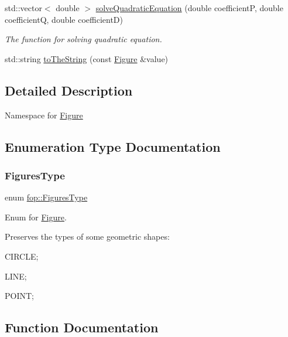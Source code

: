 \begin{DoxyCompactItemize}
std\+::vector$<$ double $>$ \mbox{\hyperlink{namespacefop_a28077bc23913a5e5f1522e7fbb13bcfe}{solve\+Quadratic\+Equation}} (double coefficientP, double coefficientQ, double coefficientD)
\begin{DoxyCompactList}\small\item\em The function for solving quadratic equation. \end{DoxyCompactList}\item 
std\+::string \mbox{\hyperlink{namespacefop_a6e88eff251cad9a76ad0c171c60ee230}{to\+The\+String}} (const \mbox{\hyperlink{classfop_1_1_figure}{Figure}} \&value)
\end{DoxyCompactItemize}


\subsection{Detailed Description}
Namespace for \mbox{\hyperlink{classfop_1_1_figure}{Figure}} 

\subsection{Enumeration Type Documentation}
\mbox{\label{namespacefop_a60dafe2e1ac5bb402dad57ecacde23d5}} 
\subsubsection{\texorpdfstring{Figures\+Type}{FiguresType}}
{\footnotesize\ttfamily enum \mbox{\hyperlink{namespacefop_a60dafe2e1ac5bb402dad57ecacde23d5}{fop\+::\+Figures\+Type}}\hspace{0.3cm}{\ttfamily [strong]}}



Enum for \mbox{\hyperlink{classfop_1_1_figure}{Figure}}. 

Preserves the types of some geometric shapes\+:
\begin{DoxyItemize}
\item C\+I\+R\+C\+LE;
\item L\+I\+NE;
\item P\+O\+I\+NT; 
\end{DoxyItemize}

\subsection{Function Documentation}
\mbox{\label{namespacefop_a386a3d90ae69e900125c0a3ad5c48cdf}} 
